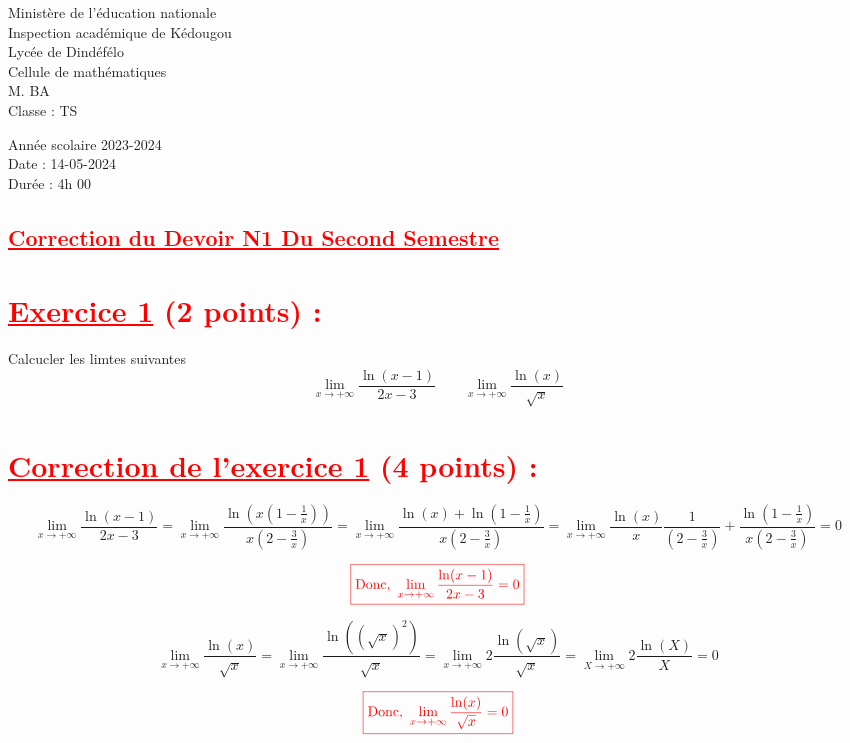 \documentclass[12pt]{article}
\begin{document}
\begin{minipage}{0.5\textwidth}
	Ministère de l'éducation nationale  \\
	Inspection académique de Kédougou   \\
	Lycée de Dindéfélo            \\
	Cellule de mathématiques            \\
	M. BA                          \\
	Classe : TS  \\
\end{minipage}
\begin{minipage}{0.5\textwidth}
	Année scolaire 2023-2024 \\
	Date : 14-05-2024 \\
	Durée : 4h 00 \\
\end{minipage}

\begin{center}
	\section*{\textcolor{red}{\underline{Correction du Devoir N1 Du Second Semestre}}}
\end{center}
\section*{\textcolor{red}{\underline{Exercice 1} (2 points) :}}
Calcucler les limtes suivantes
\[\lim_{x \to +\infty}\frac{\ln(x-1)}{2x-3}\quad\quad\lim_{x \to +\infty}\frac{\ln(x)}{\sqrt{x}}\]
\section*{\textcolor{red}{\underline{Correction de l'exercice 1} (4 points) :}}
\[\lim_{x \to +\infty}\frac{\ln(x-1)}{2x-3}=\lim_{x \to +\infty}\frac{\ln(x(1-\frac{1}{x}))}{x(2-\frac{3}{x})}=\lim_{x \to +\infty}\frac{\ln(x)+\ln(1-\frac{1}{x})}{x(2-\frac{3}{x})}=\lim_{x \to +\infty}\frac{\ln(x)}{x}\frac{1}{(2-\frac{3}{x})}+\frac{\ln(1-\frac{1}{x})}{x(2-\frac{3}{x})}=0\]

\[\color{red}{\boxed{\text{Donc, }\lim_{x \to +\infty}\frac{\ln(x-1)}{2x-3}=0} }\]

\[\lim_{x \to +\infty}\frac{\ln(x)}{\sqrt{x}}=\lim_{x \to +\infty}\frac{\ln((\sqrt{x})^{2})}{\sqrt{x}}=\lim_{x \to +\infty}2\frac{\ln(\sqrt{x})}{\sqrt{x}}=\lim_{X \to +\infty}2\frac{\ln(X)}{X}=0\]

\[\color{red}{ \boxed{\text{Donc, }\lim_{x \to +\infty}\frac{\ln(x)}{\sqrt{x}}=0} }\]
\end{document}
